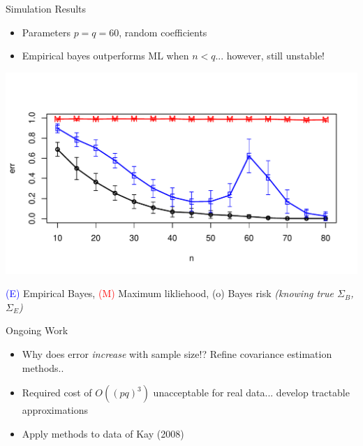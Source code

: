 \documentclass[final]{beamer}
\newlength{\onecolwid}
\begin{document}
\begin{frame}[t]
\begin{columns}[t]
\begin{column}{\onecolwid}

\begin{block}{Simulation Results}
\begin{itemize}
\item Parameters $p = q = 60$, random coefficients
\item Empirical bayes outperforms ML when $n < q$... however, still unstable!
\end{itemize}
\begin{center}
\includegraphics[scale = 1.3]{simulation1.pdf}
\end{center}
\small{
 \textcolor{blue}{(E)} Empirical Bayes,  \textcolor{red}{(M)} Maximum likliehood,
(o) Bayes risk \emph{(knowing true $\Sigma_B$, $\Sigma_E$)}}
\end{block}

\begin{block}{Ongoing Work}
\begin{itemize}
\item Why does error \emph{increase} with sample size!? Refine covariance estimation methods..
\item Required cost of $O((pq)^3)$ unacceptable for real data... develop tractable approximations
\item Apply methods to data of Kay (2008)
\end{itemize}
\end{block}



\end{column}
\end{columns}
\end{frame}
\end{document}
